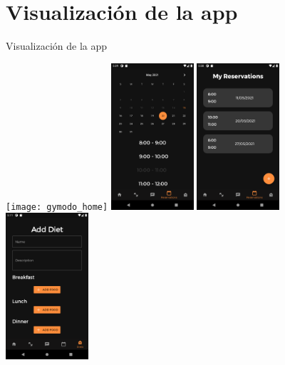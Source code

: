 \documentclass[12pt]{beamer}
\begin{document}
\section{Visualización de la app}
\begin{frame}{Visualización de la app}

 {

\begin{center}
\texttt{[image: gymodo\_home]}
\includegraphics[width=0.23\textwidth]{gymodo_create_reservation}
\includegraphics[width=0.23\textwidth]{gymodo_your_reservations}
\includegraphics[width=0.23\textwidth]{gymodo_add_diet}
\end{center}

}

 {

}
\end{frame}
\end{document}
